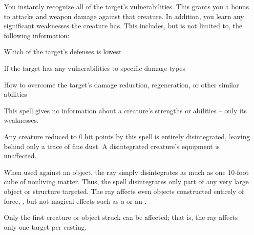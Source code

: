 \spellrng{\rngmed}
\begin{spelleffect}
  You instantly recognize all of the target's vulnerabilities. This grants you a  bonus to attacks and weapon damage against that creature. In addition, you learn any significant weaknesses the creature has. This includes, but is not limited to, the following information:
  \begin{itemize*}
    \item Which of the target's defenses is lowest
    \item If the target has any vulnerabilities to specific damage types
    \item How to overcome the target's damage reduction, regeneration, or other similar abilities
  \end{itemize*}
\end{spelleffect}
\begin{spellnotes}
  This spell gives no information about a creature's strengths or abilities -- only its weaknesses.
\end{spellnotes}

\spellrng{\rngclose}
\begin{spelleffect}
  Any creature reduced to 0 hit points by this spell is entirely disintegrated, leaving behind only a trace of fine dust. A disintegrated creature's equipment is unaffected.
  \par When used against an object, the ray simply disintegrates as much as one 10-foot cube of nonliving matter. Thus, the spell disintegrates only part of any very large object or structure targeted. The ray affects even objects constructed entirely of force, , but not magical effects such as a  or an .
\end{spelleffect}
\begin{spellnotes}
  Only the first creature or object struck can be affected; that is, the ray affects only one target per casting.
\end{spellnotes}

